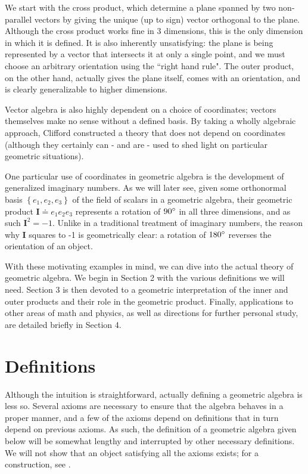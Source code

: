 \documentclass[twoside,10pt]{article}
\begin{document}
We start with the cross product, which determine a plane spanned by two non-parallel vectors by giving the unique (up to sign) vector orthogonal to the plane. Although the cross product works fine in 3 dimensions, this is the only dimension in which it is defined. It is also inherently unsatisfying: the plane is being represented by a vector that intersects it at only a single point, and we must choose an arbitrary orientation using the ``right hand rule". The outer product, on the other hand, actually gives the plane itself, comes with an orientation, and is clearly generalizable to higher dimensions.

Vector algebra is also highly dependent on a choice of coordinates; vectors themselves make no sense without a defined basis. By taking a wholly algebraic approach, Clifford constructed a theory that does not depend on coordinates (although they certainly can - and are - used to shed light on particular geometric situations).

One particular use of coordinates in geometric algebra is the development of generalized imaginary numbers. As we will later see, given some orthonormal basis $\left\{ e_1,e_2,e_3 \right\}$ of the field of scalars in a geometric algebra, their geometric product $ \mathbf{I} \doteq e_1e_2e_3$ represents a rotation of $90^\circ$ in all three dimensions, and as such $\mathbf{I}^2 = -1$. Unlike in a traditional treatment of imaginary numbers, the reason why $\mathbf{I}$ squares to -1 is geometrically clear: a rotation of $180^\circ$ reverses the orientation of an object.

With these motivating examples in mind, we can dive into the actual theory of geometric algebra. We begin in Section 2 with the various definitions we will need. Section 3 is then devoted to a geometric interpretation of the inner and outer products and their role in the geometric product. Finally, applications to other areas of math and physics, as well as directions for further personal study, are detailed briefly in Section 4.

\section{Definitions}

Although the intuition is straightforward, actually defining a geometric algebra is less so. Several axioms are necessary to ensure that the algebra behaves in a proper manner, and a few of the axioms depend on definitions that in turn depend on previous axioms. As such, the definition of a geometric algebra given below will be somewhat lengthy and interrupted by other necessary definitions. We will not show that an object satisfying all the axioms exists; for a construction, see \cite{construction}.
\end{document}
